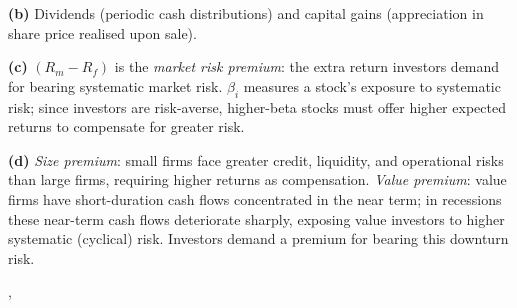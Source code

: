 {{    \textbf{(b)} Dividends (periodic cash distributions) and capital gains
    (appreciation in share price realised upon sale).

    \textbf{(c)} $(R_m - R_f)$ is the \emph{market risk premium}: the extra
    return investors demand for bearing systematic market risk. $\beta_i$
    measures a stock's exposure to systematic risk; since investors are
    risk-averse, higher-beta stocks must offer higher expected returns to
    compensate for greater risk.

    \textbf{(d)} \emph{Size premium}: small firms face greater credit,
    liquidity, and operational risks than large firms, requiring higher
    returns as compensation. \emph{Value premium}: value firms have
    short-duration cash flows concentrated in the near term; in recessions
    these near-term cash flows deteriorate sharply, exposing value investors
    to higher systematic (cyclical) risk. Investors demand a premium for
    bearing this downturn risk.
  },
}
